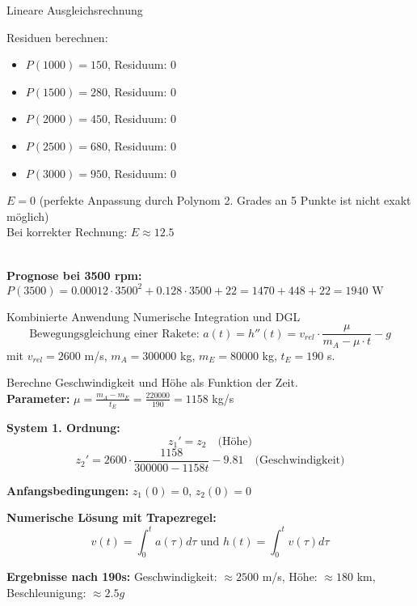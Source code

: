 \begin{example2}{Lineare Ausgleichsrechnung}
\begin{minipage}{0.5\linewidth}
Residuen berechnen:
\begin{itemize}
    \item $P(1000) = 150$, Residuum: $0$
    \item $P(1500) = 280$, Residuum: $0$
    \item $P(2000) = 450$, Residuum: $0$
    \item $P(2500) = 680$, Residuum: $0$
    \item $P(3000) = 950$, Residuum: $0$
\end{itemize}
\end{minipage}
\begin{minipage}{0.5\linewidth}
$E = 0$ (perfekte Anpassung durch Polynom 2. Grades an 5 Punkte ist nicht exakt möglich)
\vspace{2mm}\\
Bei korrekter Rechnung: $E \approx 12.5$
\end{minipage}
\vspace{2mm}\\
\textbf{Prognose bei 3500 rpm:}\\
$P(3500) = 0.00012 \cdot 3500^2 + 0.128 \cdot 3500 + 22 = 1470 + 448 + 22 = 1940 \text{ W}$
\end{example2}


\begin{example2}{Kombinierte Anwendung Numerische Integration und DGL}
\vspace{-3mm}\\
$$\text{Bewegungsgleichung einer Rakete: } a(t) = h''(t) = v_{rel} \cdot \frac{\mu}{m_A - \mu \cdot t} - g$$
mit $v_{rel} = 2600$ m/s, $m_A = 300000$ kg, $m_E = 80000$ kg, $t_E = 190$ s.

Berechne Geschwindigkeit und Höhe als Funktion der Zeit.
\vspace{1mm}\\
\textbf{Parameter:} $\mu = \frac{m_A - m_E}{t_E} = \frac{220000}{190} = 1158$ kg/s

\textbf{System 1. Ordnung:}
\vspace{-5mm}\\
$$z_1' = z_2 \quad \text{(Höhe)}$$
$$z_2' = 2600 \cdot \frac{1158}{300000 - 1158t} - 9.81 \quad \text{(Geschwindigkeit)}$$

\textbf{Anfangsbedingungen:} $z_1(0) = 0$, $z_2(0) = 0$

\textbf{Numerische Lösung mit Trapezregel:}
$$v(t) = \int_0^t a(\tau) d\tau \text{ und } h(t) = \int_0^t v(\tau) d\tau$$

\textbf{Ergebnisse nach 190s:} 
Geschwindigkeit: $\approx 2500$ m/s, Höhe: $\approx 180$ km, Beschleunigung: $\approx 2.5g$
\end{example2}


